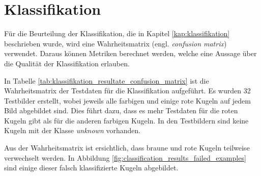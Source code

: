 \section{Klassifikation}
Für die Beurteilung der Klassifikation, die in Kapitel \ref{kap:klassifikation} beschrieben wurde, wird eine
Wahrheitsmatrix\cite{wiki:confusion_matrix} (engl. \emph{confusion matrix}) verwendet.
Daraus können Metriken berechnet werden, welche eine Aussage über die Qualität der Klassifikation erlauben.

In Tabelle \ref{tab:klassifikation_resultate_confusion_matrix} ist die Wahrheitsmatrix der Testdaten
für die Klassifikation aufgeführt. Es wurden 32 Testbilder erstellt, wobei jeweils alle farbigen und einige rote Kugeln
auf jedem Bild abgebildet sind. Dies führt dazu, dass es mehr Testdaten für die roten Kugeln gibt als für die anderen farbigen Kugeln.
In den Testbildern sind keine Kugeln mit der Klasse \emph{unknown} vorhanden.

Aus der Wahrheitsmatrix ist ersichtlich, dass braune und rote Kugeln teilweise verwechselt werden.
In Abbildung \ref{fig:classification_results_failed_examples} sind einige dieser falsch klassifizierte Kugeln abgebildet.


